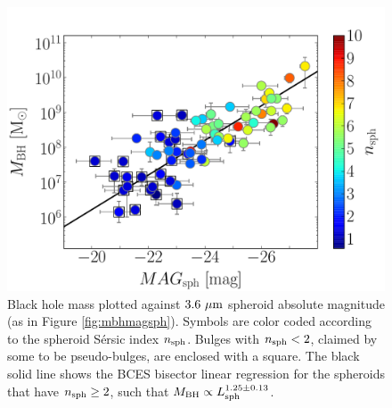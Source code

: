 \documentclass[preprint2]{emulateapj}
\begin{document}
\begin{figure}[h]
\begin{center}
\includegraphics[width=\columnwidth]{mbh_vs_mag_sph_psb.pdf}
\caption{Black hole mass plotted against $3.6\rm~\mu m$ spheroid absolute magnitude (as in Figure \ref{fig:mbhmagsph}). 
Symbols are color coded according to the spheroid S\'ersic index $n_{\rm sph}$. 
Bulges with $n_{\rm sph}<2$, claimed by some to be pseudo-bulges, are enclosed with a square. 
The black solid line shows the BCES bisector linear regression for the spheroids that have $n_{\rm sph} \geq 2$, 
such that $M_{\rm BH} \propto L_{\rm sph}^{1.25 \pm 0.13}$. }
\label{fig:pseudob}
\end{center}
\end{figure}
\end{document}
